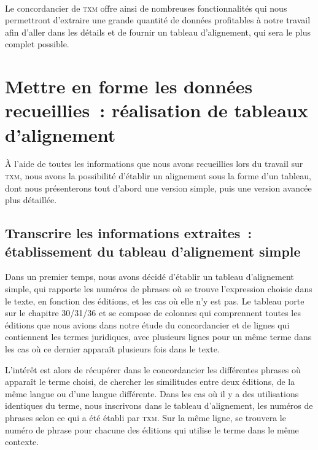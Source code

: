 \paragraph{}Le concordancier de \textsc{txm} offre ainsi de nombreuses fonctionnalités qui nous permettront d’extraire une grande quantité de données profitables à notre travail afin d’aller dans les détails et de fournir un tableau d’alignement, qui sera le plus complet possible.

\section{Mettre en forme les données recueillies~: réalisation de tableaux d’alignement}
À l’aide de toutes les informations que nous avons recueillies lors du travail sur \textsc{txm}, nous avons la possibilité d’établir un alignement sous la forme d’un tableau, dont nous présenterons tout d’abord une version simple, puis une version avancée plus détaillée.

\subsection{Transcrire les informations extraites~: établissement du tableau d’alignement simple}
Dans un premier temps, nous avons décidé d’établir un tableau d’alignement simple, qui rapporte les numéros de phrases où se trouve l’expression choisie dans le texte, en fonction des éditions, et les cas où elle n’y est pas. Le tableau porte sur le chapitre 30/31/36 et se compose de colonnes qui comprennent toutes les éditions que nous avions dans notre étude du concordancier et de lignes qui contiennent les termes juridiques, avec plusieurs lignes pour un même terme dans les cas où ce dernier apparaît plusieurs fois dans le texte. 

L’intérêt est alors de récupérer dans le concordancier les différentes phrases où apparaît le terme choisi, de chercher les similitudes entre deux éditions, de la même langue ou d’une langue différente. Dans les cas où il y a des utilisations identiques du terme, nous inscrivons dans le tableau d’alignement, les numéros de phrases selon ce qui a été établi par \textsc{txm}. Sur la même ligne, se trouvera le numéro de phrase pour chacune des éditions qui utilise le terme dans le même contexte. 

